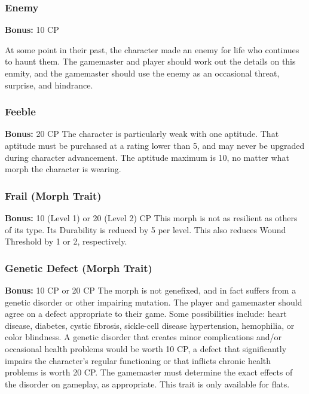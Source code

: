 \subsubsection{Enemy}

\textbf{Bonus:} 10 CP

At some point in their past, the character made 
an enemy for life who continues to haunt them. The 
gamemaster and player should work out the details on 
this enmity, and the gamemaster should use the enemy 
as an occasional threat, surprise, and hindrance.

\subsubsection{Feeble}

\textbf{Bonus:} 20 CP
The character is particularly weak with one aptitude. 
That aptitude must be purchased at a rating lower 
than 5, and may never be upgraded during character 
advancement. The aptitude maximum is 10, no matter 
what morph the character is wearing.

\subsubsection{Frail (Morph Trait)}

\textbf{Bonus:} 10 (Level 1) or 20 (Level 2) CP
This morph is not as resilient as others of its type. 
Its Durability is reduced by 5 per level. This also reduces
Wound Threshold by 1 or 2, respectively.

\subsubsection{Genetic Defect (Morph Trait)}

\textbf{Bonus:} 10 CP or 20 CP
The morph is not genefixed, and in fact suffers 
from a genetic disorder or other impairing mutation. 
The player and gamemaster should agree on a defect 
appropriate to their game. Some possibilities include: 
heart disease, diabetes, cystic fibrosis, sickle-cell disease
hypertension, hemophilia, or color blindness.
A genetic disorder that creates minor complications 
and/or occasional health problems would be worth 
10 CP, a defect that significantly impairs the character's
regular functioning or that inflicts chronic health
problems is worth 20 CP. The gamemaster must determine
the exact effects of the disorder on gameplay,
as appropriate.
This trait is only available for flats.


